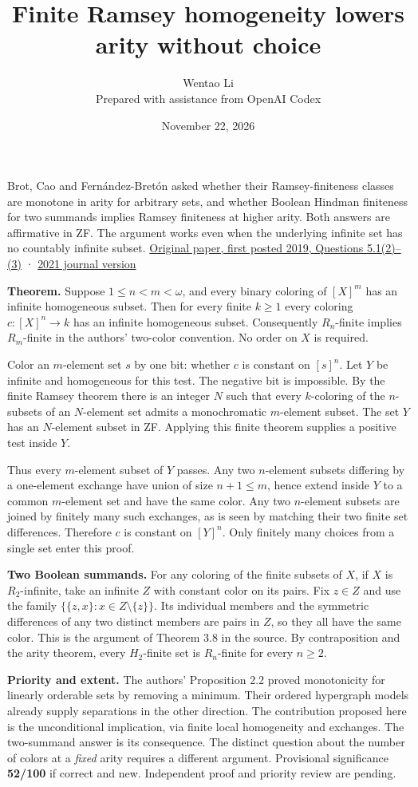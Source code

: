 \documentclass[11pt]{article}
\author{Wentao Li\\\small Prepared with assistance from OpenAI Codex}
\date{November 22, 2026}
\title{Finite Ramsey homogeneity lowers arity without choice}
\begin{document}
\maketitle
Brot, Cao and Fernández-Bretón asked whether their Ramsey-finiteness classes are monotone in arity for arbitrary sets, and whether Boolean Hindman finiteness for two summands implies Ramsey finiteness at higher arity. Both answers are affirmative in ZF. The argument works even when the underlying infinite set has no countably infinite subset. \href{https://arxiv.org/abs/1910.11025}{Original paper, first posted 2019, Questions 5.1(2)--(3)} · \href{https://doi.org/10.1016/j.apal.2021.102961}{2021 journal version}

\textbf{Theorem.} Suppose \(1\le n<m<\omega\), and every binary coloring of \([X]^m\) has an infinite homogeneous subset. Then for every finite \(k\ge1\) every coloring \(c:[X]^n\to k\) has an infinite homogeneous subset. Consequently \(R_n\)-finite implies \(R_m\)-finite in the authors' two-color convention. No order on \(X\) is required.

Color an \(m\)-element set \(s\) by one bit: whether \(c\) is constant on \([s]^n\). Let \(Y\) be infinite and homogeneous for this test. The negative bit is impossible. By the finite Ramsey theorem there is an integer \(N\) such that every \(k\)-coloring of the \(n\)-subsets of an \(N\)-element set admits a monochromatic \(m\)-element subset. The set \(Y\) has an \(N\)-element subset in ZF. Applying this finite theorem supplies a positive test inside \(Y\).

Thus every \(m\)-element subset of \(Y\) passes. Any two \(n\)-element subsets differing by a one-element exchange have union of size \(n+1\le m\), hence extend inside \(Y\) to a common \(m\)-element set and have the same color. Any two \(n\)-element subsets are joined by finitely many such exchanges, as is seen by matching their two finite set differences. Therefore \(c\) is constant on \([Y]^n\). Only finitely many choices from a single set enter this proof.

\textbf{Two Boolean summands.} For any coloring of the finite subsets of \(X\), if \(X\) is \(R_2\)-infinite, take an infinite \(Z\) with constant color on its pairs. Fix \(z\in Z\) and use the family \(\{\{z,x\}:x\in Z\setminus\{z\}\}\). Its individual members and the symmetric differences of any two distinct members are pairs in \(Z\), so they all have the same color. This is the argument of Theorem 3.8 in the source. By contraposition and the arity theorem, every \(H_2\)-finite set is \(R_n\)-finite for every \(n\ge2\).

\textbf{Priority and extent.} The authors' Proposition 2.2 proved monotonicity for linearly orderable sets by removing a minimum. Their ordered hypergraph models already supply separations in the other direction. The contribution proposed here is the unconditional implication, via finite local homogeneity and exchanges. The two-summand answer is its consequence. The distinct question about the number of colors at a \emph{fixed} arity requires a different argument. Provisional significance \textbf{52/100} if correct and new. Independent proof and priority review are pending.
\end{document}
